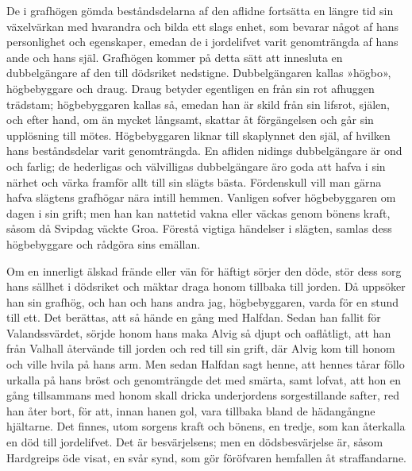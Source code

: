 De i grafhögen gömda beståndsdelarna af den aflidne fortsätta en längre
tid sin växelvärkan med hvarandra och bilda ett slags enhet, som bevarar
något af hans personlighet och egenskaper, emedan de i jordelifvet varit
genomträngda\protect\hypertarget{lb1625905.xhtmlux5cux23start190}{}{}\protect\hypertarget{lb1625905.xhtmlux5cux23start190-a}{}{}\protect\hypertarget{lb1625905.xhtmlux5cux23start190-b}{}{}\protect\hypertarget{lb1625905.xhtmlux5cux23start190-c}{}{}\protect\hypertarget{lb1625905.xhtmlux5cux23start190-d}{}{}
af hans ande och hans själ. Grafhögen kommer på detta sätt att innesluta
en dubbelgängare af den till dödsriket nedstigne. Dubbelgängaren kallas
»högbo», högbebyggare och draug. Draug betyder egentligen en från sin
rot afhuggen trädstam; högbebyggaren kallas så, emedan han är skild från
sin lifsrot, själen, och efter hand, om än mycket långsamt, skattar åt
förgängelsen och går sin upplösning till mötes. Högbebyggaren liknar
till skaplynnet den själ, af hvilken hans beståndsdelar varit
genomträngda. En afliden nidings dubbelgängare är ond och farlig; de
hederligas och välvilligas dubbelgängare äro goda att hafva i sin närhet
och värka framför allt till sin slägts bästa. Fördenskull vill man gärna
hafva slägtens grafhögar nära intill hemmen. Vanligen sofver
högbebyggaren om dagen i sin grift; men han kan nattetid vakna eller
väckas genom bönens kraft, såsom då Svipdag väckte Groa. Förestå vigtiga
händelser i slägten, samlas dess högbebyggare och rådgöra sins emällan.

Om en innerligt älskad frände eller vän för häftigt sörjer den döde,
stör dess sorg hans sällhet i dödsriket och mäktar draga honom tillbaka
till jorden. Då uppsöker han sin grafhög, och han och hans andra jag,
högbebyggaren, varda för en stund till ett. Det berättas, att så hände
en gång med Halfdan. Sedan han fallit för Valandssvärdet, sörjde honom
hans maka Alvig så djupt och oaflåtligt, att han från Valhall återvände
till jorden och red till sin grift, där Alvig kom till honom och ville
hvila på hans arm. Men sedan Halfdan sagt henne, att hennes tårar föllo
urkalla på hans bröst och genomträngde det med smärta, samt lofvat, att
hon en gång tillsammans med honom skall dricka underjordens
sorgestillande safter, red han åter bort, för att, innan hanen gol, vara
tillbaka bland de hädangångne hjältarne. Det finnes, utom sorgens kraft
och bönens, en tredje, som kan återkalla en död till jordelifvet. Det är
besvärjelsens; men en dödsbesvärjelse är, såsom Hardgreips öde visat, en
svår synd, som gör föröfvaren hemfallen åt straffandarne.

